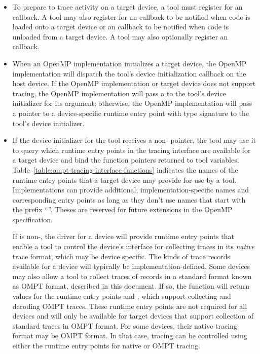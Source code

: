 \begin{itemize}
\item To prepare to trace activity on a target device, a tool must register for an
   callback.  A tool may also register for an
   callback to be notified when code is loaded onto a target device or
an  callback to be notified when code is unloaded from a target device.
A tool may also optionally register an  callback.
\item When an OpenMP implementation initializes a target device, the
  OpenMP implementation will dispatch the tool's device initialization
  callback on the host device. If the OpenMP implementation or target device does not support tracing,
  the OpenMP implementation will pass a  to the tool's device initializer for its
   argument; otherwise, the OpenMP implementation will pass
  a pointer to a device-specific runtime entry point with type
  signature  to the tool's device initializer.
\item If the device initializer for the tool receives a
  non-  pointer, the tool may use it to query
  which runtime entry points in the tracing interface are available for a target device
  and bind the function pointers returned to tool variables.
  Table~\ref{table:ompt-tracing-interface-functions} indicates the
  names of the runtime entry points that a target device may provide for use
  by a tool.
  Implementations
can provide additional, implementation-specific names and corresponding
entry points as long as they don't use names that start with the prefix
``''. Theses are reserved for future extensions in the
OpenMP specification.

  If  is non-, the driver for a device will
  provide runtime entry points that enable a tool to control the device's
  interface for collecting traces in its \emph{native} trace format,
  which may be device specific.
  The kinds of trace records available for a device will typically be
  implementation-defined.
  Some devices may also allow a tool to
  collect traces of records in a standard format known as OMPT format,
  described in this document. If so, the  function will
  return values for the runtime entry points
   and , which support
  collecting and decoding OMPT traces.
  These runtime entry points are not required for all devices and will only be available for target devices that support
  collection of standard traces in OMPT format.
  For some devices, their native
  tracing format may be OMPT format. In that case, tracing can be
  controlled using either the runtime entry points for native or OMPT
  tracing.


\end{itemize}
